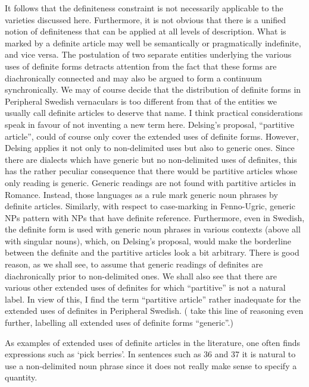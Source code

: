 \begin{styleBodyTextFirst}
It follows that the definiteness constraint is not necessarily applicable to the varieties discussed here. Furthermore, it is not obvious that there is a unified notion of definiteness that can be applied at all levels of description. What is marked by a definite article may well be semantically or pragmatically indefinite, and vice versa. The postulation of two separate entities underlying the various uses of definite forms detracts attention from the fact that these forms are diachronically connected and may also be argued to form a continuum synchronically. We may of course decide that the distribution of definite forms in Peripheral Swedish vernaculars is too different from that of the entities we usually call definite articles to deserve that name. I think practical considerations speak in favour of not inventing a new term here. Delsing’s proposal, “partitive article”, could of course only cover the extended uses of definite forms. However, Delsing applies it not only to non-delimited uses but also to generic ones. Since there are dialects which have generic but no non-delimited uses of definites, this has the rather peculiar consequence that there would be partitive articles whose only reading is generic. Generic readings are not found with partitive articles in Romance. Instead, those languages as a rule mark generic noun phrases by definite articles. Similarly, with respect to case-marking in Fenno-Ugric, generic NPs pattern with NPs that have definite reference. Furthermore, even in Swedish, the definite form is used with generic noun phrases in various contexts (above all with singular nouns), which, on Delsing’s proposal, would make the borderline between the definite and the partitive articles look a bit arbitrary. There is good reason, as we shall see, to assume that generic readings of definites are diachronically prior to non-delimited ones. We shall also see that there are various other extended uses of definites for which “partitive” is not a natural label. In view of this, I find the term “partitive article” rather inadequate for the extended uses of definites in Peripheral Swedish. (\citet{BergholmEtAl1999} take this line of reasoning even further, labelling all extended uses of definite forms “generic”.)

\end{styleBodyTextFirst}

\begin{styleBodytextC}
As examples of extended uses of definite articles in the literature, one often finds expressions such as ‘pick berries’. In sentences such as 36 and 37 it is natural to use a non-delimited noun phrase since it does not really make sense to specify a quantity. 

\end{styleBodytextC}

